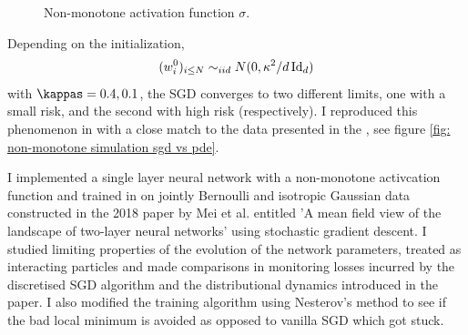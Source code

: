 \documentclass{article}
\begin{document}
\begin{figure}[H]
    \centering
    
    \caption{Non-monotone activation function $\sigma$.}
    \label{fig: non-monotone activation fn}
\end{figure}

\noindent Depending on the initialization,
\begin{equation}
(w^{0}_{i})_{i\leq N}\sim_{iid} N(0, \kappa^{2}/d\operatorname{Id}_{d})
\end{equation}
with $ \kappas = 0.4, 0.1$, the SGD converges to two different limits, one with a small risk,
and the second with high risk (respectively). I reproduced this phenomenon in with a close match to the data presented in the \cite{Mei_2018}, see figure \ref{fig: non-monotone simulation sgd vs pde}.

I implemented a single layer neural network with a non-monotone activcation function and trained in on jointly Bernoulli and isotropic Gaussian data constructed in the 2018 paper by Mei et al. entitled 'A mean field view of the landscape of two-layer neural networks' using stochastic gradient descent. I studied limiting properties of the evolution of the network parameters, treated as interacting particles and made comparisons in monitoring losses incurred by the discretised SGD algorithm and the distributional dynamics introduced in the paper. I also modified the training algorithm using Nesterov's method to see if the bad local minimum is avoided as opposed to vanilla SGD which got stuck.
\end{document}
